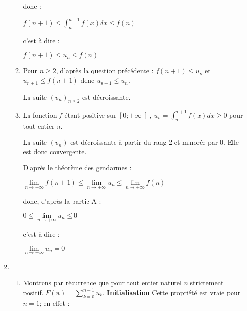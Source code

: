 \begin{corrige}
\begin{enumerate}
\begin{enumerate}[label=\alph*.]
               \par
               donc :
               \par
               $f\left(n+1\right) \leqslant  \int_{n}^{n+1}f\left(x\right)dx \leqslant  f\left(n\right)$
               \par
               c'est à dire :
               \par
               $f\left(n+1\right) \leqslant  u_{n} \leqslant  f\left(n\right)$
               \item
               Pour $n\geqslant 2$, d'après la question précédente : $f\left(n+1\right) \leqslant  u_{n}$ et $u_{n+1}\leqslant  f\left(n+1\right)$ donc $u_{n+1}\leqslant  u_{n}$.
               \par
               La suite $\left(u_{n}\right)_{n\geqslant 2}$ est décroissante.
               \item
               La fonction $f$ étant positive sur $\left[0; +\infty \right[$, $u_{n}=\int_{n}^{n+1}f\left(x\right)dx \geqslant  0$ pour tout entier $n$.
               \par
               La suite $\left(u_{n}\right)$ est décroissante à partir du rang 2 et minorée par 0. Elle est donc convergente.
               \par
               D'après le théorème des gendarmes :
               \par
               $\lim\limits_{n\rightarrow +\infty }f\left(n+1\right) \leqslant  \lim\limits_{n\rightarrow +\infty }u_{n} \leqslant  \lim\limits_{n\rightarrow +\infty }f\left(n\right)$
               \par
               donc, d'après la partie A :
               \par
               $0 \leqslant  \lim\limits_{n\rightarrow +\infty }u_{n} \leqslant  0$
               \par
               c'est à dire :
               \par
               $\lim\limits_{n\rightarrow +\infty }u_{n} = 0$
          \end{enumerate}
          \item
          \begin{enumerate}[label=\alph*.]
               \item
               Montrons par récurrence que pour tout entier naturel $n$ strictement positif, $F\left(n\right) = \sum_{k=0}^{n-1}u_{k}$.
               \textbf{Initialisation}
               Cette propriété est vraie pour $n = 1$; en effet :
               \par

\end{enumerate}
\end{enumerate}
\end{corrige}
